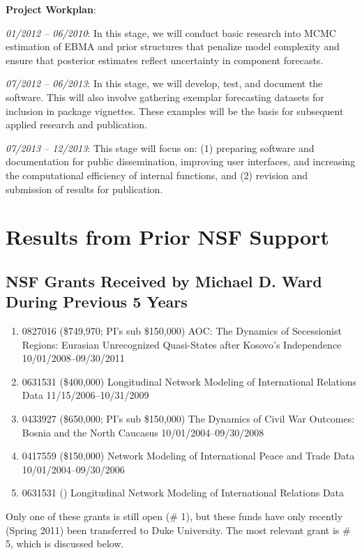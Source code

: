 \documentclass[pdftex,12pt,fullpage,oneside]{amsart}
\begin{document}
\textbf{Project Workplan}:

\noindent \textit{01/2012 -- 06/2010}: In this stage, we will conduct basic
research into MCMC estimation of EBMA and prior structures that
penalize model complexity and ensure that posterior estimates reflect
uncertainty in component forecasts.

\noindent \textit{07/2012 -- 06/2013}: In this stage, we will develop,
test, and document the software. This will also involve gathering
exemplar forecasting datasets for inclusion in package vignettes.
These examples will be the basis for subsequent applied research and
publication.

\noindent \textit{07/2013 -- 12/2013}: This stage will focus on: (1)
preparing software and documentation for public dissemination,
improving user interfaces, and increasing the computational efficiency
of internal functions, and (2) revision and submission of results for
publication.



\section{Results from Prior NSF Support}

\subsection{NSF Grants Received by Michael D. Ward During Previous 5 Years}

\begin{enumerate}

\item 0827016 (\$749,970; PI's sub \$150,000) AOC: The Dynamics of
  Secessionist Regions: Eurasian Unrecognized Quasi-States after
  Kosovo's Independence 10/01/2008--09/30/2011

\item 0631531 (\$400,000) Longitudinal Network Modeling of
  International Relations Data 11/15/2006--10/31/2009

\item 0433927 (\$650,000; PI's sub \$150,000) The Dynamics of Civil
  War Outcomes: Bosnia and the North Caucasus 10/01/2004--09/30/2008

\item 0417559 (\$150,000) Network Modeling of International Peace and
  Trade Data 10/01/2004--09/30/2006

\item 0631531 () Longitudinal Network Modeling of International Relations Data  
\end{enumerate}  Only one of these grants is still open (\# 1), but these funds have
only recently (Spring 2011) been transferred to Duke University. The
most relevant grant is \# 5, which is discussed below. \vspace{.1in}
\end{document}
